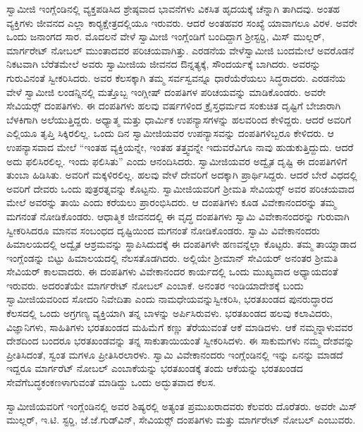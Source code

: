  ಸ್ವಾಮೀಜಿ ಇಂಗ್ಲೆಂಡಿನಲ್ಲಿ ವ್ಯಕ್ತಪಡಿಸಿದ ಶ್ರೇಷ್ಠವಾದ ಭಾವನೆಗಳು ವಿಕಸಿತ ಹೃದಯಕ್ಕೆ ಚೆನ್ನಾಗಿ ತಾಗಿದವು. ಅಂತಹ ವ್ಯಕ್ತಿಗಳು ಜೀವನದ ಎಲ್ಲಾ ಕಾರ‍್ಯಕ್ಷೇತ್ರದಲ್ಲಿಯೂ ಇರುವರು. ಆದರೆ ಅಂತಹವರ ಸಂಖ್ಯೆ ಯಾವಾಗಲೂ ವಿರಳ. ಅವರೇ ಒಂದು ಜನಾಂಗದ ಸಾರ. ಮೊದಲನೆ ವೇಳೆ ಸ್ವಾಮೀಜಿ ಇಂಗ್ಲೆಂಡಿಗೆ ಬಂದಿದ್ದಾಗ ಶ‍್ರೀಸ್ಟರ‍್ಡಿ, ಮಿಸ್ ಮುಲ್ಲರ್, ಮಾರ್ಗರೇಟ್ ನೋಬಲ್ ಮುಂತಾದವರ ಪರಿಚಯವಾಗಿತ್ತು. ಎರಡನೆಯ ವೇಳೆ\break ಸ್ವಾಮೀಜಿ ಬಂದಮೇಲೆ ಅವರೊಡನೆ ನಿಕಟವಾಗಿ ಬೆರೆತಮೇಲೆ ಅವರು ಸ್ವಾಮೀಜಿಯ ಜೀವನದ ಔನ್ನತ್ಯಕ್ಕೆ, ಸೌಂದರ್ಯಕ್ಕೆ ಬಾಗಿದರು. ಅವರನ್ನು ಗುರುವಿನಂತೆ ಸ್ವೀಕರಿಸಿದರು. ಅವರ ಕೆಲಸಕ್ಕಾಗಿ ತಮ್ಮ ಸರ್ವಸ್ವವನ್ನೂ ಧಾರೆಯೆರೆಯಲು ಸಿದ್ಧರಾದರು. ಎರಡನೆಯ ವೇಳೆ ಸ್ವಾಮೀಜಿ ಲಂಡನ್ನಿನಲ್ಲಿ ಮತ್ತೊಬ್ಬ ಇಂಗ್ಲೀಷ್ ದಂಪತಿಗಳ ಪರಿಚಯವನ್ನು ಮಾಡಿಕೊಂಡರು. ಅವರೇ ಸೇವಿಯರ್ಸ್‍‍ ದಂಪತಿಗಳು. ಈ ದಂಪತಿಗಳು ಹಲವು ವರ್ಷಗಳಿಂದ ಕ್ರೈಸ್ತಧರ್ಮದ ಸಂಕುಚಿತ ದೃಷ್ಟಿಗೆ ಬೇಜಾರಾಗಿ ಬೆಳಕಿಗಾಗಿ ಅಲೆಯುತ್ತಿದ್ದರು. ಅಧ್ಯಾತ್ಮ ಮತ್ತು ಧಾರ್ಮಿಕ ಉಪನ್ಯಾಸಗಳನ್ನು ಹಲವರಿಂದ ಕೇಳಿದ್ದರು. ಆದರೆ ಅವರಿಗೆ ಎಲ್ಲಿಯೂ ತೃಪ್ತಿ ಸಿಕ್ಕಿರಲಿಲ್ಲ. ಒಂದು ದಿನ ಸ್ವಾಮೀಜಿಯವರ ಉಪನ್ಯಾಸವನ್ನು ದಂಪತಿಗಳಿಬ್ಬರೂ ಕೇಳಿದರು. ಆ ಉಪನ್ಯಾಸವಾದ ಮೇಲೆ “ಇಂತಹ ವ್ಯಕ್ತಿಯನ್ನೇ, ಇಂತಹ ತತ್ತ್ವವನ್ನೇ ಇದುವರೆವಿಗೂ ನಾವು ಹುಡುಕುತ್ತಿದ್ದುದು. ಆದರೆ ಅದು ಫಲಿಸಿರಲಿಲ್ಲ. ಇಂದು ಫಲಿಸಿತು” ಎಂದು ಆನಂದಿಸಿದರು. ಸ್ವಾಮೀಜಿಯವರ ಅದ್ವೈತ ದೃಷ್ಟಿ ಈ ದಂಪತಿಗಳಿಗೆ ತುಂಬಾ ಹಿಡಿಸಿತು. ಅವರಿಗೆ ಮಕ್ಕಳಿರಲಿಲ್ಲ. ಹಲವು ವೇಳೆ ದೇವರಿಗೆ ಅದಕ್ಕಾಗಿ ಪ್ರಾರ್ಥಿಸಿದ್ದರು. ಆದರೆ ಬೇರೆ ವಿಧದಲ್ಲಿ ಅವರಿಗೆ ದೇವರು ಒಂದು ಪುತ್ರರತ್ನವನ್ನು ಕೊಟ್ಟನು. ಸ್ವಾಮೀಜಿಯವರಿಗೆ ಶ‍್ರೀಮತಿ ಸೇವಿಯರ್ಸ್‍‍ ಅವರ ಪರಿಚಯವಾದ ಮೇಲೆ ಅವರನ್ನು ತಾಯಿ ಎಂದು ಕರೆಯಲು ಪ್ರಾರಂಭಿಸಿದರು. ಆ ದಂಪತಿಗಳು ಕೂಡ ವಿವೇಕಾನಂದರನ್ನು ತಮ್ಮ ಮಗನಂತೆ ನೋಡಿಕೊಂಡರು. ಆಧಾತ್ಮಿಕ ಜೀವನದಲ್ಲಿ ಈ ವೃದ್ಧ ದಂಪತಿಗಳು ಸ್ವಾಮಿ ವಿವೇಕಾನಂದರನ್ನು ಗುರುವಾಗಿ ಸ್ವೀಕರಿಸಿದರೂ ಮಾನವ ಸಂಬಂಧದ ದೃಷ್ಟಿಯಿಂದ ಮಗನಂತೆ ನೋಡಿಕೊಂಡರು. ಸ್ವಾಮಿ ವಿವೇಕಾನಂದರು ಹಿಮಾಲಯದಲ್ಲಿ ಅದ್ವೈತ ಆಶ್ರಮವನ್ನು ಸ್ಥಾಪಿಸಿದುದಕ್ಕೆ ಈ ದಂಪತಿಗಳೇ ಹಣವನ್ನೆಲ್ಲಾ ಕೊಟ್ಟರು. ತಮ್ಮ ತಾಯ್ನಾಡಾದ ಇಂಗ್ಲೆಂಡನ್ನು ಬಿಟ್ಟು ಹಿಮಾಲಯದಲ್ಲಿ ನೆಲಸತೊಡಗಿದರು. ಅಲ್ಲಿಯೇ ಶ‍್ರೀಮಾನ್ ಸೇವಿಯರ್ ಅನಂತರ ಶ‍್ರೀಮತಿ ಸೇವಿಯರ್ ಕಾಲವಾದರು. ಈ ದಂಪತಿಗಳು ವಿವೇಕಾನಂದರ ಕಾರ್ಯದಲ್ಲಿ ಒಂದು ಮುಖ್ಯವಾದ ಅಧ್ಯಾಯದಂತೆ ಇರುವರು. ಅದರಂತೆಯೇ ಮಾರ್ಗರೇಟ್ ನೋಬಲ್ ಎಂಬಾಕೆ. ಅನಂತರ ಇಂಡಿಯಾದೇಶಕ್ಕೆ ಬಂದು ಸ್ವಾಮೀಜಿಯವರಿಂದ ಸೋದರಿ ನಿವೇದಿತಾ ಎಂದು ನಾಮಧೇಯವನ್ನು\break ಸ್ವೀಕರಿಸಿ, ಭರತಖಂಡದ ಪುನರುದ್ಧಾರದ ಕೆಲಸದಲ್ಲಿ ಒಂದು ಅಗ್ರಗಣ್ಯ ವ್ಯಕ್ತಿಯಾಗಿ ತನ್ನ ಬಾಳನ್ನು ಅರ್ಪಿಸಿರುವಳು. ಭರತಖಂಡದ ಹಲವು ಕಲಾವಿದರು, ವಿಜ್ಞಾನಿಗಳು, ಸಾಹಿತಿಗಳು ಭರತಖಂಡದ ಮಹಿಮೆಗೆ ಕಣ್ಣು ತೆರೆಯುವಂತೆ ಆಕೆ ಮಾಡಿದಳು. ಆಕೆ ನಮ್ಮನ್ನಾಳುವವರ ದೇಶದಿಂದ ಬಂದರೂ ಭರತಖಂಡವನ್ನು ತನ್ನ ಸಾಕುತಾಯಿಯಂತೆ ಸ್ವೀಕರಿಸಿದಳು. ಈ ಸಾಕುಮಗಳು ನಮ್ಮ ದೇಶವನ್ನು ಪ್ರೀತಿಸಿದಂತೆ, ಸ್ವಂತ ಮಗಳೂ ಪ್ರೀತಿಸಿರಲಾರಳು. ಸ್ವಾಮಿ ವಿವೇಕಾನಂದರು ಇಂಗ್ಲೆಂಡಿನಲ್ಲಿ ಇನ್ನು ಏನನ್ನು ಮಾಡದೆ ಇದ್ದರೂ ಮಾರ್ಗರೆಟ್ ನೋಬಲ್ ಎಂಬಾಕೆಯನ್ನು ಭರತಖಂಡಕ್ಕೆ ತಂದು ಆಕೆಯನ್ನು ಭರತಖಂಡದ ಸೇವೆಗೆ\break ಬದ್ಧಕಂಕಣಳಾಗುವಂತೆ ಮಾಡಿದ್ದು ಒಂದು ಅದ್ಭುತವಾದ ಕೆಲಸ. 

 ಸ್ವಾಮೀಜಿಯವರಿಗೆ ಇಂಗ್ಲೆಂಡಿನಲ್ಲಿ ಅವರ ಶಿಷ್ಯರಲ್ಲಿ ಅತ್ಯಂತ ಪ್ರಮುಖರಾದವರು ಕೆಲವರು ದೊರೆತರು. ಅವರೇ ಮಿಸ್ ಮುಲ್ಲರ್, ಇ.ಟಿ. ಸ್ಟರ‍್ಡಿ, ಜೆ.ಜೆ.ಗುಡ್‍ವಿನ್, ಸೇವಿಯರ್ಸ್‍‍ ದಂಪತಿಗಳು ಮತ್ತು ಮಾರ್ಗರೇಟ್ ನೋಬಲ್ ಎಂಬುವರು. 

